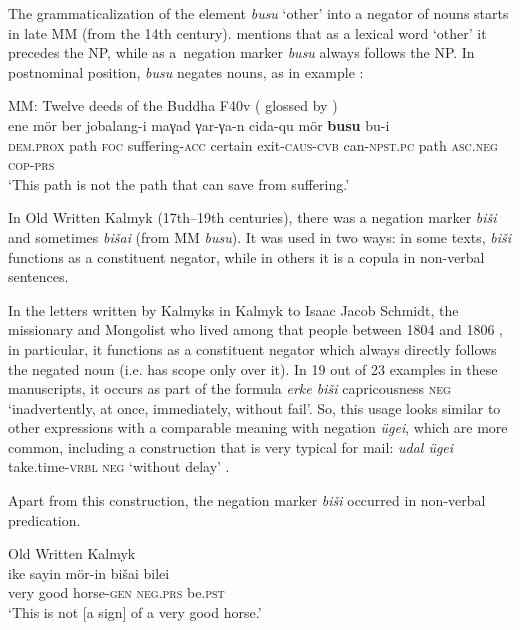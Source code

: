 \documentclass[output=paper]{langsci/langscibook}
\begin{document}
The grammaticalization of the element \textit{busu} ‘other’ into a negator of nouns starts in late MM (from the 14th century). \citet[127]{yu1991a} mentions that as a lexical word ‘other’ it precedes the NP, while as a negation marker \textit{busu} always follows the NP. In postnominal position, \textit{busu} negates nouns, as in example :


\ea\label{ex:bashkir:50} MM: Twelve deeds of the Buddha F40v (\citealt[49, 141]{bawden_1969} glossed by \citealt[105]{brosig2015a}) \label{ex:BK50}\\
	\gll ene				mör	ber	jobalang-i		maγad	γar-γa-n			cida-qu			mör	\textbf{busu}			bu-i\\
	\textsc{dem.prox}	path	\textsc{foc}	suffering-\textsc{acc}	certain	exit-\textsc{caus-cvb}	can-\textsc{npst.pc}	path	\textsc{asc.neg}		\textsc{cop-prs}\\
	\glt `This path is not the path that can save from suffering.'
\z

In Old Written Kalmyk (17th–19th centuries), there was a negation marker \textit{biši} and sometimes \textit{bišai} (from MM \textit{busu}). It was used in two ways: in some texts, \textit{biši} functions as a constituent negator, while in others it is a copula in non-verbal sentences.

In the letters written by Kalmyks in Kalmyk to Isaac Jacob Schmidt, the missionary and Mongolist who lived among that people between 1804 and 1806 \citep{krueger2002a}, in particular, it functions as a constituent negator which always directly follows the negated noun (i.e. has scope only over it). In 19 out of 23 examples in these manuscripts, it occurs as part of the formula \textit{erke biši} capricousness \textsc{neg} ‘inadvertently, at once, immediately, without fail’. So, this usage looks similar to other expressions with a comparable meaning with negation \textit{ügei}, which are more common, including a construction that is very typical for mail: \textit{udal ügei} take.time-\textsc{vrbl neg} ‘without delay’ \citep[57]{krueger2002a}.

Apart from this construction, the negation marker \textit{biši} occurred in non-verbal predication.

\ea Old Written Kalmyk \citep[27, Letter 9, lines 7–8]{krueger2002a} \label{ex:BK51}\\
	\gll ike		sayin		mör-in		bišai		bilei\\
	very	good		horse-\textsc{gen}	\textsc{neg.prs}	be.\textsc{pst}\\
	\glt `This is not [a sign] of a very good horse.'
\z
\end{document}
